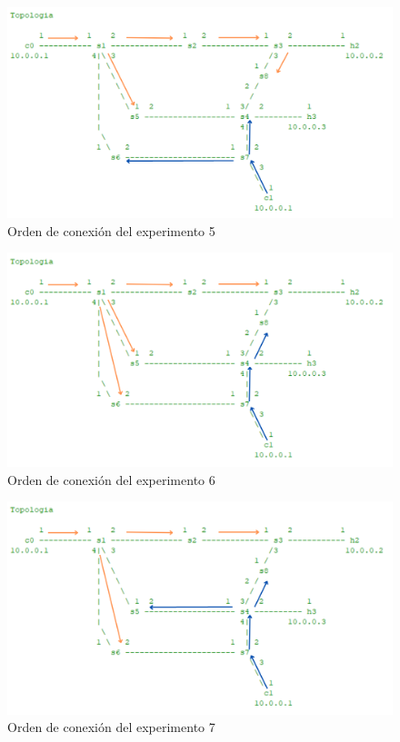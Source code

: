 \documentclass[a4paper, 12pt]{book}
\begin{document}
 	\begin{figure}[H]
 		\centering
 		\includegraphics[width=16cm, keepaspectratio]{img/escenario1_2c_4}
 		\caption{Orden de conexión del experimento 5}
 		\label{figura:escenario1_2c_4}
 	\end{figure}
 	
 	\begin{figure}[H]
 		\centering
 		\includegraphics[width=16cm, keepaspectratio]{img/escenario1_2c_5}
 		\caption{Orden de conexión del experimento 6}
 		\label{figura:escenario1_2c_5}
 	\end{figure}
 	
 	\begin{figure}
 		\centering
 		\includegraphics[width=16cm, keepaspectratio]{img/escenario1_2c_6}
 		\caption{Orden de conexión del experimento 7}
 		\label{figura:escenario1_2c_6}
 	\end{figure}
 	
\end{document}
